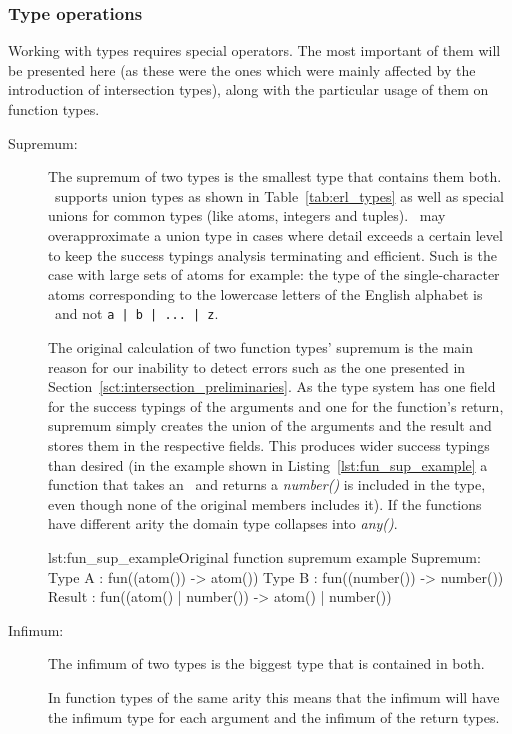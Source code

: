 \subsubsection{Type operations}
\label{sct:orig_type_operations}

Working with types requires special operators. The most important of
them will be presented here (as these were the ones which were mainly
affected by the introduction of intersection types), along with the
particular usage of them on function types.
\begin{description}
\item[Supremum:] The supremum of two types is the smallest type that
  contains them both. \er\ supports union types as shown in
  Table~\ref{tab:erl_types} as well as special unions for common types
  (like atoms, integers and tuples). \dr\ may overapproximate a union
  type in cases where detail exceeds a certain level to keep the
  success typings analysis terminating and efficient. Such is the case
  with large sets of atoms for example: the type of the
  single-character atoms corresponding to the lowercase letters of the
  English alphabet is \atom\ and not \texttt{a | b | ... | z}.

  The original calculation of two function types' supremum is the main
  reason for our inability to detect errors such as the one presented
  in Section~\ref{sct:intersection_preliminaries}. As the type system
  has one field for the success typings of the arguments and one for
  the function's return, supremum simply creates the union of the
  arguments and the result and stores them in the respective
  fields. This produces wider success typings than desired (in the
  example shown in Listing~\ref{lst:fun_sup_example} a function that
  takes an \atom\ and returns a \emph{number()} is included in the
  type, even though none of the original members includes it). If the
  functions have different arity the domain type collapses into
  \emph{any()}.

\begin{console}{lst:fun_sup_example}{Original function supremum example}
Supremum:
Type A : fun((atom())   -> atom())
Type B : fun((number()) -> number())
Result : fun((atom() | number()) -> atom() | number())
\end{console}

\item[Infimum:] The infimum of two types is the biggest type that is
  contained in both.

  In function types of the same arity this means that the infimum will
  have the infimum type for each argument and the infimum of the
  return types.


\end{description}
